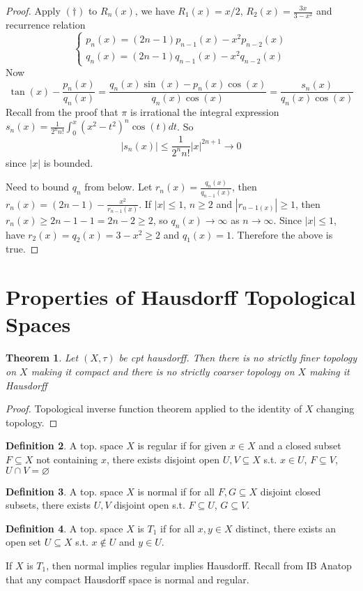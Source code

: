 \documentclass{article}
\theoremstyle{definition}
\newtheorem{defn}{Definition}[section]
\theoremstyle{remark}
\theoremstyle{plain}
\newtheorem{thm}[defn]{Theorem}
\begin{document}
\begin{proof}
    Apply $(\dagger)$ to $R_n(x)$, we have $R_1(x)=x/2$, $R_2(x)=\frac{3x}{3-x^2}$ and recurrence relation
    \[\begin{cases}
        p_n(x)=(2n-1)p_{n-1}(x)-x^2p_{n-2}(x)\\
        q_n(x)=(2n-1)q_{n-1}(x)-x^2q_{n-2}(x)
    \end{cases}\]
    Now 
    \[\tan(x)-\frac{p_n(x)}{q_n(x)}=\frac{q_n(x)\sin(x)-p_n(x)\cos(x)}{q_n(x)\cos(x)}=\frac{s_n(x)}{q_n(x)\cos(x)}\]
    Recall from the proof that $\pi$ is irrational the integral expression $s_n(x)=\frac{1}{2^nn!}\int_0^x(x^2-t^2)^n\cos(t)dt$.
    So \[|s_n(x)|\le \frac{1}{2^nn!}|x|^{2n+1}\to 0\] since $|x|$ is bounded.
    
    Need to bound $q_n$ from below. Let $r_n(x)=\frac{q_n(x)}{q_{n-1}(x)}$, then $r_{n}(x)=(2n-1)-\frac{x^2}{r_{n-1}(x)}$. If $|x|\le 1$, $n\ge 2$ and $|r_{n-1(x)}|\ge 1$, then $r_n(x)\ge 2n-1-1=2n-2\ge 2$, so $q_n(x)\to \infty$ as $n\to\infty$. Since $|x|\le 1$, have $r_2(x)=q_2(x)=3-x^2\ge 2$ and $q_1(x)=1$. Therefore the above is true.
\end{proof}

\section{Properties of Hausdorff Topological Spaces}
\begin{thm}
    Let $(X,\tau)$ be cpt hausdorff. Then there is no strictly finer topology on $X$ making it compact and there is no strictly coarser topology on $X$ making it Hausdorff
\end{thm}
\begin{proof}
    Topological inverse function theorem applied to the identity of $X$ changing topology.
\end{proof}
\begin{defn}
    A top. space $X$ is regular if for given $x\in X$ and a closed subset $F\subseteq X$ not containing $x$, there exists disjoint open $U,V\subseteq X$ s.t. $x\in U$, $F\subseteq V$, $U\cap V=\varnothing$
\end{defn}
\begin{defn}
    A top. space $X$ is normal if for all $F,G\subseteq X$ disjoint closed subsets, there exists $U,V$ disjoint open s.t. $F\subseteq U$, $G\subseteq V$.
\end{defn}
\begin{defn}
    A top. space $X$ is $T_1$ if for all $x,y\in X$ distinct, there exists an open set $U\subseteq X$ s.t. $x\notin U$ and $y\in U$.
\end{defn}
If $X$ is $T_1$, then normal implies regular implies Hausdorff. Recall from IB Anatop that any compact Hausdorff space is normal and regular.
\end{document}
